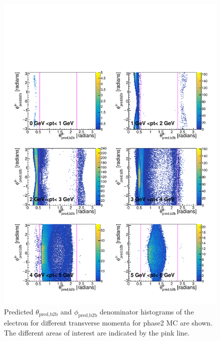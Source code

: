 \documentclass[a4paper,11pt,twosided,final,german,openbib,pdftex,listof=totoc,bibliography=totoc]{scrbook}
\begin{document}
\begin{figure}[h!]
	\includegraphics[width=\textwidth]{Plots/master/RTPtMemD_MC.pdf}
	\caption[Denominator $\theta_{\textrm{pred,b2b}}$-$\phi_{\textrm{pred,b2b}}$ Electron Transverse Momentum MC]{Predicted $\theta_{\textrm{pred,b2b}}$ and $\phi_{\textrm{pred,b2b}}$ denominator histograms of the electron for different transverse momenta for phase2 MC are shown. The different areas of interest are indicated by the pink line.
}
	\label{plt:RTPtMemD_MC}
\end{figure}
\end{document}
